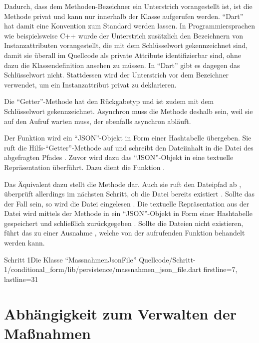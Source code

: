 Dadurch, dass dem Methoden-Bezeichner  ein Unterstrich vorangestellt ist, ist die Methode privat und kann nur innerhalb der Klasse aufgerufen werden.
\enquote{Dart} hat damit eine Konvention zum Standard werden lassen.
In Programmiersprachen wie beispielsweise C++ wurde der Unterstrich zusätzlich den Bezeichnern von Instanzattributen vorangestellt,
die mit dem  Schlüsselwort gekennzeichnet sind,
damit sie überall im Quellcode als private Attribute identifizierbar sind, ohne dazu die Klassendefinition ansehen zu müssen.
In \enquote{Dart} gibt es dagegen das  Schlüsselwort nicht.
Stattdessen wird der Unterstrich vor dem Bezeichner verwendet, um ein Instanzattribut privat zu deklarieren.

Die \enquote{Getter}-Methode  hat den Rückgabetyp  und ist zudem mit dem Schlüsselwort  gekennzeichnet.
Asynchron muss die Methode deshalb sein, weil sie auf den Aufruf  warten muss, der ebenfalls asynchron abläuft.

Der Funktion   wird ein \enquote{JSON}-Objekt in Form einer Hashtabelle übergeben.
Sie ruft die Hilfs-\enquote{Getter}-Methode   auf und schreibt den Dateiinhalt in die Datei des abgefragten Pfades .
Zuvor wird dazu das \enquote{JSON}-Objekt in eine textuelle Repräsentation überführt.
Dazu dient die Funktion .

Das Äquivalent dazu stellt die Methode   dar.
Auch sie ruft den Dateipfad ab , überprüft allerdings im nächsten Schritt, ob die Datei bereits existiert .
Sollte das der Fall sein, so wird die Datei eingelesen .
Die textuelle Repräsentation aus der Datei wird mittels der Methode  in ein \enquote{JSON}-Objekt in Form einer Hashtabelle gespeichert  und schließlich zurückgegeben .
Sollte die Dateien nicht existieren, führt das zu einer Ausnahme , welche von der aufrufenden Funktion behandelt werden kann.

\begin{alexlisting}{Schritt 1}{Die Klasse \enquote{MassnahmenJsonFile}}
  {Quellcode/Schritt-1/conditional_form/lib/persistence/massnahmen_json_file.dart}
  {firstline=7, lastline=31}
  \label{lst:Schritt1KlasseMassnahmenJsonFile}
\end{alexlisting}


\section{ Abhängigkeit zum Verwalten der Maßnahmen}

